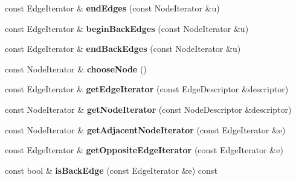 \begin{DoxyCompactItemize}
\item 
\hypertarget{class_adjacency_vector_impl_af114baa7bb65546250b41124cdf3f7dd}{
const EdgeIterator \& {\bfseries endEdges} (const NodeIterator \&u)}
\label{class_adjacency_vector_impl_af114baa7bb65546250b41124cdf3f7dd}

\item 
\hypertarget{class_adjacency_vector_impl_acf68508d2e89e473b397245b9ba57cce}{
const EdgeIterator \& {\bfseries beginBackEdges} (const NodeIterator \&u)}
\label{class_adjacency_vector_impl_acf68508d2e89e473b397245b9ba57cce}

\item 
\hypertarget{class_adjacency_vector_impl_abac32b753cbe54fb99a82ab4f38826cb}{
const EdgeIterator \& {\bfseries endBackEdges} (const NodeIterator \&u)}
\label{class_adjacency_vector_impl_abac32b753cbe54fb99a82ab4f38826cb}

\item 
\hypertarget{class_adjacency_vector_impl_a1daed3d45c03d0b122dffc6b20a92b3a}{
const NodeIterator \& {\bfseries chooseNode} ()}
\label{class_adjacency_vector_impl_a1daed3d45c03d0b122dffc6b20a92b3a}

\item 
\hypertarget{class_adjacency_vector_impl_a77a6f34a09d45f7c752527ada23d19a6}{
const EdgeIterator \& {\bfseries getEdgeIterator} (const EdgeDescriptor \&descriptor)}
\label{class_adjacency_vector_impl_a77a6f34a09d45f7c752527ada23d19a6}

\item 
\hypertarget{class_adjacency_vector_impl_a7a30cba77020776a5a1fc258a769e743}{
const NodeIterator \& {\bfseries getNodeIterator} (const NodeDescriptor \&descriptor)}
\label{class_adjacency_vector_impl_a7a30cba77020776a5a1fc258a769e743}

\item 
\hypertarget{class_adjacency_vector_impl_a6dea4aa15b006efbf6fa275b085af78f}{
const NodeIterator \& {\bfseries getAdjacentNodeIterator} (const EdgeIterator \&e)}
\label{class_adjacency_vector_impl_a6dea4aa15b006efbf6fa275b085af78f}

\item 
\hypertarget{class_adjacency_vector_impl_a003eb09fd853b93a29602995c911d669}{
const EdgeIterator \& {\bfseries getOppositeEdgeIterator} (const EdgeIterator \&e)}
\label{class_adjacency_vector_impl_a003eb09fd853b93a29602995c911d669}

\item 
\hypertarget{class_adjacency_vector_impl_a344cb0514645f006e5dc503861bf42c3}{
const bool \& {\bfseries isBackEdge} (const EdgeIterator \&e) const }
\label{class_adjacency_vector_impl_a344cb0514645f006e5dc503861bf42c3}


\end{DoxyCompactItemize}
